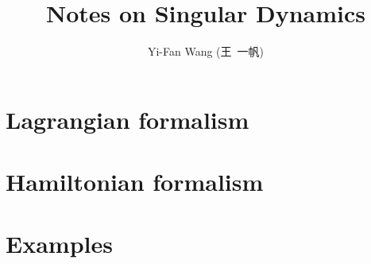 \documentclass[a4paper,10pt]{article}
\title{Notes on Singular Dynamics}
\author{Yi-Fan Wang (王\ 一帆)}
\begin{document}
\maketitle

\section{Lagrangian formalism}

\section{Hamiltonian formalism}

\section{Examples}

\printbibliography
\end{document}
